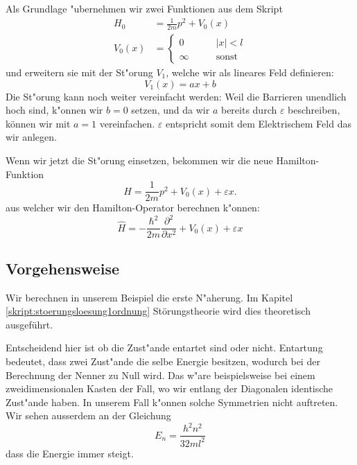 \begin{refsection}
Als Grundlage "ubernehmen wir zwei Funktionen aus dem Skript
\begin{equation}
\begin{aligned}
H_0&=\frac1{2m}p^2+V_0(x)
\\
V_0(x)&=
  \begin{cases}
    0       & \qquad |x|<l\\
    \infty  & \qquad\text{sonst}
  \end{cases}
\end{aligned}
\end{equation}
und erweitern sie mit der St"orung $V_1$, welche wir als lineares Feld definieren:
\begin{equation}
  V_1(x) = a x + b
\end{equation}
Die St"orung kann noch weiter vereinfacht werden:
Weil die Barrieren unendlich hoch sind, k"onnen wir $b = 0$ setzen,
und da wir $a$ bereits durch $\varepsilon$ beschreiben, k\"onnen wir mit $a = 1$ vereinfachen.
$\varepsilon$ entspricht somit dem Elektrischem Feld das wir anlegen.


Wenn wir jetzt die St"orung einsetzen, bekommen wir die neue Hamilton-Funktion
\[
  H=\frac1{2m}p^2+V_0(x)
    + \varepsilon x.
\]
aus welcher wir den Hamilton-Operator berechnen k"onnen:
\[
  \hat{H} = -\frac{\hbar^2}{2m} \frac{\partial^2}{\partial x^2} + V_0(x) + \varepsilon x
\]

\subsection{Vorgehensweise}
Wir berechnen in unserem Beispiel die erste N"aherung.
Im Kapitel \ref{skript:stoerungsloesung1ordnung} St\"orungstheorie wird dies 
theoretisch ausgef\"uhrt.

Entscheidend hier ist ob die Zust"ande entartet sind oder nicht.
Entartung bedeutet, dass zwei Zust"ande die selbe Energie besitzen, 
wodurch bei der Berechnung der Nenner zu Null wird.
Das w"are beispielsweise bei einem zweidimensionalen Kasten der Fall,
wo wir entlang der Diagonalen identische Zust"ande haben.
In unserem Fall k"onnen solche Symmetrien nicht auftreten.
Wir sehen ausserdem an der Gleichung
\[
  E_n = \frac{h^2n^2}{32ml^2}
\]
dass die Energie immer steigt.


\end{refsection}
